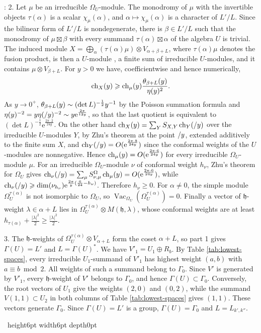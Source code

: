 \documentclass[leqno]{article}
\renewcommand{\geq}{\ensuremath{\geqslant}}
\newcommand{\qed}{\hfill \vrule height6pt  width6pt depth0pt}
\newcommand{\ot}{\otimes}
\let\i\relax
\newcommand{\i}{\mathrm{i}}
\newcommand{\e}{\mathrm{e}}
\newenvironment{proof}[1][]{\noindent {\it Proof #1} : }{\hbox{~}\qed
\smallskip
}
\numberwithin{equation}{section}
\begin{document}
\begin{proof}
2. Let $\mu$ be an irreducible $\Omega_U$-module. The monodromy of $\mu$ with the invertible objects $\tau(\alpha)$ is a scalar $\chi_\mu(\alpha)$, and $\alpha \mapsto \chi_\mu(\alpha)$ is a character of $L'/L$. Since the bilinear form of $L'/L$ is nondegenerate, there is $\beta \in L'/L$ such that the monodromy of $\mu \boxtimes \beta$ with every summand $\tau(\alpha) \boxtimes \alpha$ of the algebra $U$ is trivial. The induced module $X = \bigoplus_\alpha (\tau(\alpha)\mu) \ot V_{\alpha+\beta+L}$, where $\tau(\alpha)\mu$ denotes the fusion product, is then a $U$-module \cite{HKL15,CKM22}, a finite sum of irreducible $U$-modules, and it contains $\mu \ot V_{\beta+L}$. For $y > 0$ we have, coefficientwise and hence numerically,
\[
\operatorname{ch}_X(\i y) \geq \operatorname{ch}_\mu(\i y)\frac{\theta_{\beta+L}(\i y)}{\eta(\i y)^2}.
\]
As $y \to 0^+$, $\theta_{\beta+L}(\i y) \sim (\det L)^{-\frac12}y^{-1}$ by the Poisson summation formula and $\eta(\i y)^{-2} = y\eta(\i/y)^{-2} \sim y\e^{\frac{2\pi}{12y}}$, so that the last quotient is equivalent to $(\det L)^{-\frac12}\e^{\frac{2\pi\cdot2}{24y}}$. On the other hand $\operatorname{ch}_X(\i y) = \sum_Y S_{X,Y}\operatorname{ch}_Y(\i/y)$ over the irreducible $U$-modules $Y$, by Zhu's theorem \cite{Zhu96} at the point $\i/y$, extended additively to the finite sum $X$, and $\operatorname{ch}_Y(\i/y) = O(\e^{\frac{2\pi\cdot8}{24y}})$ since the conformal weights of the $U$-modules are nonnegative. Hence $\operatorname{ch}_\mu(\i y) = O(\e^{\frac{2\pi\cdot6}{24y}})$ for every irreducible $\Omega_U$-module $\mu$. For an irreducible $\Omega_U$-module $\nu$ of conformal weight $h_\nu$, Zhu's theorem for $\Omega_U$ gives $\operatorname{ch}_\nu(\i/y) = \sum_\mu S^{\Omega}_{\nu,\mu}\operatorname{ch}_\mu(\i y) = O(\e^{\frac{2\pi\cdot6}{24y}})$, while $\operatorname{ch}_\nu(\i/y) \geq \dim(\nu_{h_\nu})\e^{\frac{2\pi}{y}(\frac6{24}-h_\nu)}$. Therefore $h_\nu \geq 0$. For $\alpha \neq 0$, the simple module $\Omega_U^{\tau(\alpha)}$ is not isomorphic to $\Omega_U$, so $\operatorname{Vac}_{\Omega_U}(\Omega_U^{\tau(\alpha)}) = 0$. Finally a vector of $\mathfrak h$-weight $\lambda \in \alpha+L$ lies in $\Omega_U^{\tau(\alpha)} \ot M(\mathfrak h,\lambda)$, whose conformal weights are at least $h_{\tau(\alpha)}+\frac{|\lambda|^2}2 \geq \frac{|\lambda|^2}2$.

3. The $\mathfrak h$-weights of $\Omega_U^{\tau(\alpha)} \ot V_{\alpha+L}$ form the coset $\alpha+L$, so part 1 gives $\Gamma(U) = L'$ and $L = \Gamma(U)^*$. We have $V'_1 = U_1 \oplus R_b$. By Table \ref{tab:lowest-spaces}, every irreducible $U_1$-summand of $V'_1$ has highest weight $(a,b)$ with $a \equiv b \bmod 2$. All weights of such a summand belong to $\Gamma_0$. Since $V'$ is generated by $V'_1$, every $\mathfrak h$-weight of $V'$ belongs to $\Gamma_0$, and hence $\Gamma(U) \subset \Gamma_0$. Conversely, the root vectors of $U_1$ give the weights $(2,0)$ and $(0,2)$, while the summand $V(1,1) \subset U_2$ in both columns of Table \ref{tab:lowest-spaces} gives $(1,1)$. These vectors generate $\Gamma_0$. Since $\Gamma(U) = L'$ is a group, $\Gamma(U) = \Gamma_0$ and $L = L_{k',k''}$.


\end{proof}
\end{document}
